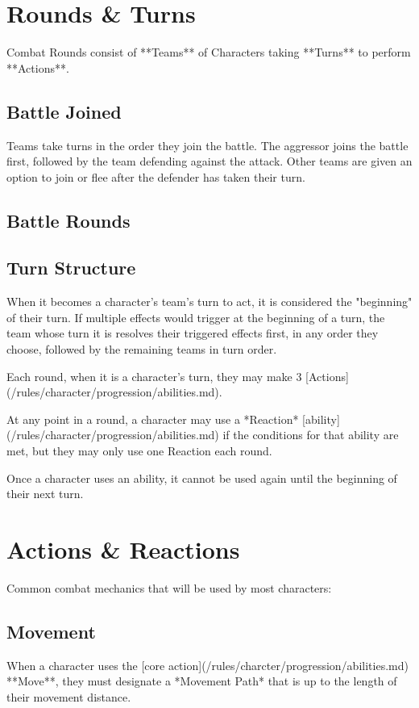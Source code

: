\section{Rounds \& Turns}
Combat Rounds consist of **Teams** of Characters taking **Turns** to perform **Actions**.
\subsection{Battle Joined}
Teams take turns in the order they join the battle. 
The aggressor joins the battle first, followed by the team defending against the attack.
Other teams are given an option to join or flee after the defender has taken their turn.
\subsection{Battle Rounds}
\subsection{Turn Structure}
When it becomes a character's team's turn to act, it is considered the "beginning" of their turn.
If multiple effects would trigger at the beginning of a turn,
the team whose turn it is resolves their triggered effects first, in any order they choose,
followed by the remaining teams in turn order.

Each round, when it is a character's turn, 
they may make 3 [Actions](/rules/character/progression/abilities.md).

At any point in a round, a character may use a *Reaction* [ability](/rules/character/progression/abilities.md)
if the conditions for that ability are met, but they may only use one Reaction each round.

Once a character uses an ability, it cannot be used again until the beginning of their next turn.

\section{Actions \& Reactions}
Common combat mechanics that will be used by most characters:
\subsection{Movement}
When a character uses the [core action](/rules/charcter/progression/abilities.md) **Move**, 
they must designate a *Movement Path* that is up to the length of their movement distance.

